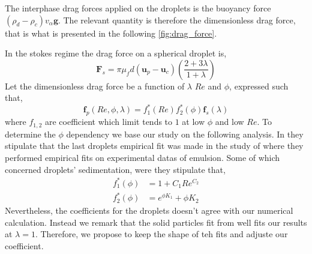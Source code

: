 The interphase drag forces applied on the droplets is the buoyancy force $(\rho_d-\rho_c)v_\alpha \textbf{g}$.
The relevant quantity is therefore the dimensionless drag force, that is what is presented in the following \ref{fig:drag_force}. 


In the stokes regime the drag force on a spherical droplet is, 
\begin{equation*}
    \textbf{F}_s
    =\pi \mu_f d (\textbf{u}_p - \textbf{u}_c) \left(\frac{2+3\lambda}{1+\lambda}\right)
\end{equation*}
Let the dimensionless drag force be a function of $\lambda$ $Re$ and $\phi$, expressed such that, 
\begin{equation}
    \textbf{f}_p(Re,\phi,\lambda)
    = 
    f_1^*(Re)
    f_2^*(\phi)
    \textbf{f}_s(\lambda)
\end{equation}
where $f_{1,2}$ are coefficient which limit tends to $1$ at low $\phi$ and low $Re$. 
To determine the $\phi$ dependency we base our study on the following analysis. 
In \cite[chapter 4]{ashgriz2011handbook} they stipulate that the last droplets empirical fit was made in the study of \citet{rusche2000effect} where they performed empirical fits on experimental datas of emulsion. 
Some of which concerned droplets' sedimentation, were they stipulate that, 
\begin{align*}
    f_1^*(\phi) 
    &=1  + C_1 Re^{C_2}\\
    f_2^*(\phi) 
    &= e^{\phi K_1} + \phi K_2
    \label{eq:drag_fit}
\end{align*}
Nevertheless, the coefficients for the droplets doesn't agree with our numerical calculation. 
Instead we remark that the solid particles fit from \citet{rusche2000effect} well fits our results at $\lambda = 1$. 
Therefore, we propose to keep the shape of teh fits and adjuste our coefficient. 

